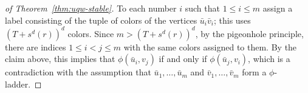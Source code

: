 \begin{proof}[ of Theorem~\ref{thm:uqw-stable}]
To each number $i$ such that $1\le i\le m$ assign a label consisting of  the tuple of colors of the vertices $\bar u_i\bar v_i$; this uses $(T+s^d(r))^{d}$ colors.
 Since $m>(T+s^d(r))^d$, by the pigeonhole principle, there are indices $1\le i<j\le m$
 with the same colors assigned to them.  
By the claim above, this  implies that $\phi(\bar u_i,v_j)$
 if and only if $\phi(\bar u_j,v_i)$, which is a contradiction with the assumption that $\bar u_1,\ldots,\bar u_m$ and $\bar v_1,\ldots,\bar v_m$ form a $\phi$-ladder.
\end{proof}



